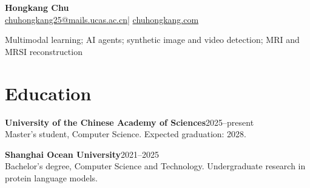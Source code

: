 \documentclass[10pt,letterpaper]{article}
\begin{document}
\begin{center}{\LARGE\bfseries Hongkang Chu}\\[5pt]
\href{mailto:chuhongkang25@mails.ucas.ac.cn}{chuhongkang25@mails.ucas.ac.cn}\quad|\quad
\href{https://chuhongkang.com}{chuhongkang.com}\end{center}

{\small Multimodal learning; AI agents; synthetic image and video detection; MRI and MRSI reconstruction}
\section{Education}
\textbf{University of the Chinese Academy of Sciences}\hfill 2025--present\\
Master's student, Computer Science. Expected graduation: 2028.\par\vspace{5pt}
\textbf{Shanghai Ocean University}\hfill 2021--2025\\
Bachelor's degree, Computer Science and Technology. Undergraduate research in protein language models.\par\vspace{5pt}
\end{document}
